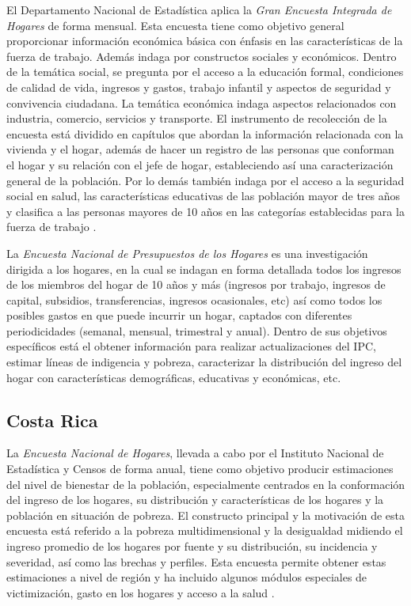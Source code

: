 \documentclass[
  12pt,
  spanish,
]{book}
\begin{document}
El Departamento Nacional de Estadística aplica la \emph{Gran Encuesta Integrada de Hogares} de forma mensual. Esta encuesta tiene como objetivo general proporcionar información económica básica con énfasis en las características de la fuerza de trabajo. Además indaga por constructos sociales y económicos. Dentro de la temática social, se pregunta por el acceso a la educación formal, condiciones de calidad de vida, ingresos y gastos, trabajo infantil y aspectos de seguridad y convivencia ciudadana. La temática económica indaga aspectos relacionados con industria, comercio, servicios y transporte. El instrumento de recolección de la encuesta está dividido en capítulos que abordan la información relacionada con la vivienda y el hogar, además de hacer un registro de las personas que conforman el hogar y su relación con el jefe de hogar, estableciendo así una caracterización general de la población. Por lo demás también indaga por el acceso a la seguridad social en salud, las características educativas de las población mayor de tres años y clasifica a las personas mayores de 10 años en las categorías establecidas para la fuerza de trabajo \citep{DANE-COL_2017}.

La \emph{Encuesta Nacional de Presupuestos de los Hogares} es una investigación dirigida a los hogares, en la cual se indagan en forma detallada todos los ingresos de los miembros del hogar de 10 años y más (ingresos por trabajo, ingresos de capital, subsidios, transferencias, ingresos ocasionales, etc) así como todos los posibles gastos en que puede incurrir un hogar, captados con diferentes periodicidades (semanal, mensual, trimestral y anual). Dentro de sus objetivos específicos está el obtener información para realizar actualizaciones del IPC, estimar líneas de indigencia y pobreza, caracterizar la distribución del ingreso del hogar con características demográficas, educativas y económicas, etc. \citep{DANE-COL_2018}

\hypertarget{costa-rica}{%
\subsection{Costa Rica}\label{costa-rica}}

La \emph{Encuesta Nacional de Hogares}, llevada a cabo por el Instituto Nacional de Estadística y Censos de forma anual, tiene como objetivo producir estimaciones del nivel de bienestar de la población, especialmente centrados en la conformación del ingreso de los hogares, su distribución y características de los hogares y la población en situación de pobreza. El constructo principal y la motivación de esta encuesta está referido a la pobreza multidimensional y la desigualdad midiendo el ingreso promedio de los hogares por fuente y su distribución, su incidencia y severidad, así como las brechas y perfiles. Esta encuesta permite obtener estas estimaciones a nivel de región y ha incluido algunos módulos especiales de victimización, gasto en los hogares y acceso a la salud \citep{INEC-CR_2017}.
\end{document}
